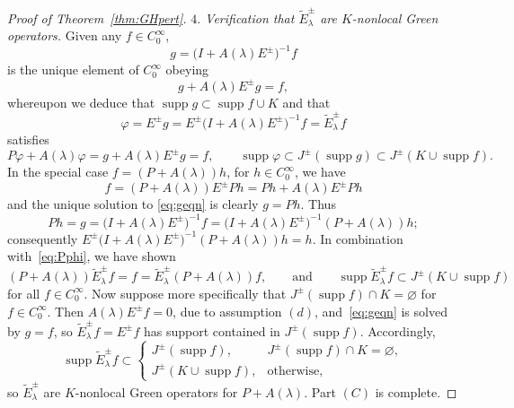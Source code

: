 \documentclass[11pt]{article}
\numberwithin{equation}{section}
\numberwithin{equation}{section}
\DeclareMathOperator{\supp}{supp}
\begin{document}
\begin{proof}[Proof of Theorem~\ref{thm:GHpert}]
 	\emph{$4.$ Verification that $\tilde{E}^\pm_\lambda$ are $K$-nonlocal Green operators.}
 	Given any $f\in C_0^\infty$,
 	\begin{equation*}
 		g=\big(I+ A(\lambda)E^\pm\big)^{-1} f
 	\end{equation*}
 	is the unique element of $C_0^\infty$ obeying
 	\begin{equation}\label{eq:geqn}
 		g + A(\lambda) E^\pm g= f,
 	\end{equation}
 	whereupon we deduce that $\supp g\subset \supp f \cup K$ and that
 	\begin{equation*}
 		\varphi = E^\pm g = E^\pm \big(I+ A(\lambda)E^\pm\big)^{-1} f = \tilde{E}^\pm_\lambda f
 	\end{equation*}
 	satisfies
 	\begin{equation}\label{eq:Pphi}
 		P\varphi + A(\lambda)\varphi = g+A(\lambda)E^\pm g=f, \qquad \supp \varphi\subset J^\pm(\supp g) \subset J^\pm(K\cup \supp f).
 	\end{equation}
 	In the special case $f=(P+A(\lambda))h$, for $h\in C_0^\infty$,
 	we have
 	\begin{equation*}
 		f = (P+ A(\lambda))E^\pm P h=Ph + A(\lambda) E^\pm Ph
 	\end{equation*}
 	and the unique solution to \eqref{eq:geqn} is clearly $g=Ph$. Thus
 	\begin{equation*}
 		Ph=g=\big(I+ A(\lambda)E^\pm\big)^{-1}f =\big(I+ A(\lambda)E^\pm\big)^{-1}(P+ A(\lambda))h;
 	\end{equation*}
 	consequently $E^\pm \big(I+ A(\lambda)E^\pm\big)^{-1} (P+ A(\lambda))h = h$.
 	In combination with~\eqref{eq:Pphi}, we have shown
 	\begin{equation*}
 		(P+ A(\lambda))\tilde{E}^\pm_\lambda f=f = \tilde{E}^\pm_\lambda (P+ A(\lambda)) f,\qquad\text{and}\qquad
 		\supp\tilde{E}^\pm_\lambda f\subset J^\pm(K\cup \supp f)
 	\end{equation*}
 	for all $f\in C_0^\infty$.
 	Now suppose more specifically that $J^\pm(\supp f)\cap K=\varnothing$ for $f\in C^\infty_0$. Then $A(\lambda)E^\pm f=0$, due to assumption $(d)$, and~\eqref{eq:geqn} is solved by $g=f$, so
 	$\tilde{E}^\pm_\lambda f=E^\pm f$ has support contained in $J^\pm(\supp f)$. Accordingly,
 	\begin{equation*}
 		\supp\tilde{E}^\pm_\lambda f\subset
 		\begin{cases}
 			J^\pm(\supp f), & J^\pm(\supp f)\cap K=\varnothing ,\\
 			J^\pm(K\cup \supp f), & \text{otherwise,}
 		\end{cases}
 	\end{equation*}
 	so $\tilde{E}^\pm_\lambda$ are $K$-nonlocal Green operators for $P+ A(\lambda)$. Part $(C)$ is complete.
 	

\end{proof}
\end{document}
